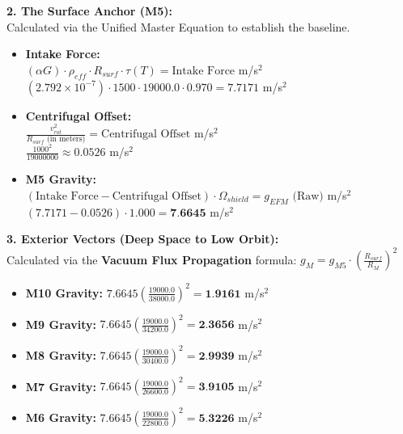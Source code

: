 \documentclass[11pt, a4paper]{article}
\begin{document}
  \vspace{1.0em}
  \noindent \textbf{2. The Surface Anchor (M5):} \\
  \hspace*{1em} Calculated via the Unified Master Equation to establish the baseline.
  \begin{itemize}
    \item \textbf{Intake Force:} \\[0.5em]
    \hspace*{2em} $(\alpha G) \cdot \rho_{eff} \cdot R_{surf} \cdot \tau(T) = \text{Intake Force}$ m/s$^2$ \\[1em]
    \hspace*{2em} $(2.792 \times 10^{-7}) \cdot 1500 \cdot 19000.0 \cdot 0.970 = 7.7171$ m/s$^2$
    
    \item \textbf{Centrifugal Offset:} \\[0.5em]
    \hspace*{2em} $\frac{v_{rot}^2}{R_{surf} \text{ (in meters)}} = \text{Centrifugal Offset}$ m/s$^2$ \\[1em]
    \hspace*{2em} $\frac{1000^2}{19000000} \approx 0.0526$ m/s$^2$
    
    \item \textbf{M5 Gravity:} \\[0.5em]
    \hspace*{2em} $(\text{Intake Force} - \text{Centrifugal Offset}) \cdot \Omega_{shield} = g_{EFM} \text{ (Raw)}$ m/s$^2$ \\[1em]
    \hspace*{2em} $(7.7171 - 0.0526) \cdot 1.000 = \textbf{7.6645}$ m/s$^2$
  \end{itemize}

  \clearpage
  \noindent \textbf{3. Exterior Vectors (Deep Space to Low Orbit):} \\
  \hspace*{1em} Calculated via the \textbf{Vacuum Flux Propagation} formula: $g_M = g_{M5} \cdot \left( \frac{R_{surf}}{R_M} \right)^2$
  \begin{itemize}
    \item \textbf{M10 Gravity:} $7.6645 \left( \frac{19000.0}{38000.0} \right)^2 = \textbf{1.9161}$ m/s$^2$
    \item \textbf{M9 Gravity:} $7.6645 \left( \frac{19000.0}{34200.0} \right)^2 = \textbf{2.3656}$ m/s$^2$
    \item \textbf{M8 Gravity:} $7.6645 \left( \frac{19000.0}{30400.0} \right)^2 = \textbf{2.9939}$ m/s$^2$
    \item \textbf{M7 Gravity:} $7.6645 \left( \frac{19000.0}{26600.0} \right)^2 = \textbf{3.9105}$ m/s$^2$
    \item \textbf{M6 Gravity:} $7.6645 \left( \frac{19000.0}{22800.0} \right)^2 = \textbf{5.3226}$ m/s$^2$
  \end{itemize}
\end{document}
